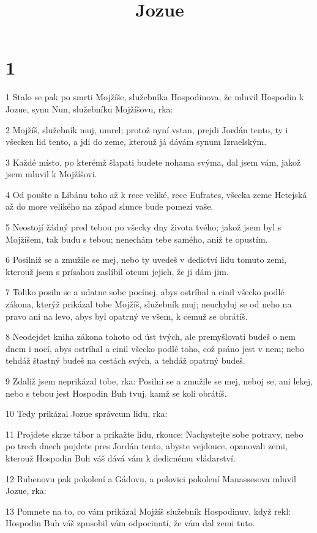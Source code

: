

\title{Jozue}

\chapter{1}

\par 1 Stalo se pak po smrti Mojžíše, služebníka Hospodinova, že mluvil Hospodin k Jozue, synu Nun, služebníku Mojžíšovu, rka:
\par 2 Mojžíš, služebník muj, umrel; protož nyní vstan, prejdi Jordán tento, ty i všecken lid tento, a jdi do zeme, kterouž já dávám synum Izraelským.
\par 3 Každé místo, po kterémž šlapati budete nohama svýma, dal jsem vám, jakož jsem mluvil k Mojžíšovi.
\par 4 Od poušte a Libánu toho až k rece veliké, rece Eufrates, všecka zeme Hetejská až do more velikého na západ slunce bude pomezí vaše.
\par 5 Neostojí žádný pred tebou po všecky dny života tvého; jakož jsem byl s Mojžíšem, tak budu s tebou; nenechám tebe samého, aniž te opustím.
\par 6 Posilniž se a zmužile se mej, nebo ty uvedeš v dedictví lidu tomuto zemi, kterouž jsem s prísahou zaslíbil otcum jejich, že ji dám jim.
\par 7 Toliko posiln se a udatne sobe pocínej, abys ostríhal a cinil všecko podlé zákona, kterýž prikázal tobe Mojžíš, služebník muj; neuchyluj se od neho na pravo ani na levo, abys byl opatrný ve všem, k cemuž se obrátíš.
\par 8 Neodejdet kniha zákona tohoto od úst tvých, ale premyšlovati budeš o nem dnem i nocí, abys ostríhal a cinil všecko podlé toho, což psáno jest v nem; nebo tehdáž štastný budeš na cestách svých, a tehdáž opatrný budeš.
\par 9 Zdaliž jsem neprikázal tobe, rka: Posilni se a zmužile se mej, neboj se, ani lekej, nebo s tebou jest Hospodin Buh tvuj, kamž se koli obrátíš.
\par 10 Tedy prikázal Jozue správcum lidu, rka:
\par 11 Projdete skrze tábor a prikažte lidu, rkouce: Nachystejte sobe potravy, nebo po trech dnech pujdete pres Jordán tento, abyste vejdouce, opanovali zemi, kterouž Hospodin Buh váš dává vám k dedicnému vládarství.
\par 12 Rubenovu pak pokolení a Gádovu, a polovici pokolení Manassesova mluvil Jozue, rka:
\par 13 Pomnete na to, co vám prikázal Mojžíš služebník Hospodinuv, když rekl: Hospodin Buh váš zpusobil vám odpocinutí, že vám dal zemi tuto.
